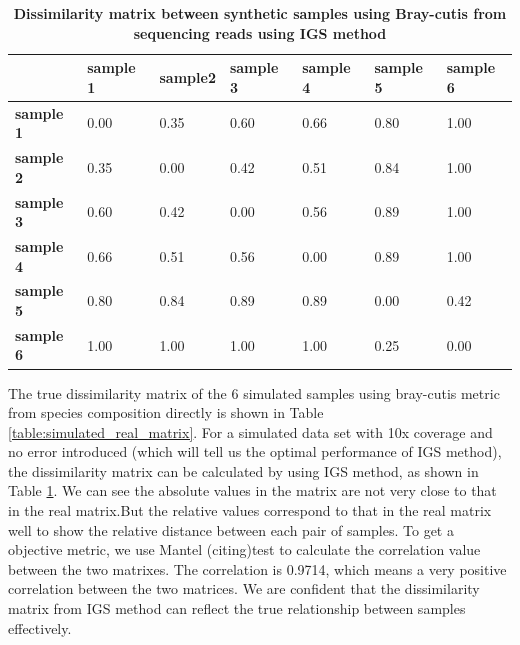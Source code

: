 \begin{table}[h]
\begin{tabular}{|l|l|l|l|l|l|l|}
\hline
                  & \textbf{sample 1} & \textbf{sample2} & \textbf{sample 3} & \textbf{sample 4} & \textbf{sample 5} & \textbf{sample 6} \\ \hline
\textbf{sample 1} & 0.00              & 0.35             & 0.60              & 0.66              & 0.80              & 1.00              \\ \hline
\textbf{sample 2} & 0.35              & 0.00             & 0.42              & 0.51              & 0.84              & 1.00              \\ \hline
\textbf{sample 3} & 0.60              & 0.42             & 0.00              & 0.56              & 0.89              & 1.00              \\ \hline
\textbf{sample 4} & 0.66              & 0.51             & 0.56              & 0.00              & 0.89              & 1.00              \\ \hline
\textbf{sample 5} & 0.80              & 0.84             & 0.89              & 0.89              & 0.00              & 0.42              \\ \hline
\textbf{sample 6} & 1.00              & 1.00             & 1.00              & 1.00              & 0.25              & 0.00              \\ \hline
\end{tabular}
\caption{\bf Dissimilarity matrix between synthetic samples using Bray-cutis from sequencing reads using IGS method }
\label{table:simulated_matrix1}
\end{table}


The true dissimilarity matrix of the 6 simulated samples using bray-cutis 
metric from species composition directly is shown in Table \ref{table:simulated_real_matrix}.
For a simulated data set with 10x coverage and no error introduced 
(which will tell us the optimal performance of IGS method), the dissimilarity 
matrix can be calculated by using IGS method, as shown in Table 
\ref{table:simulated_matrix1}. We can see the absolute values in the matrix 
are not very close to that in the real matrix.But the relative values 
correspond to that in the real matrix well to show the relative distance 
between each pair of samples. To get a objective metric, we use 
Mantel (citing)test to calculate the correlation value between the two 
matrixes. The correlation is 0.9714, which means a very positive correlation 
between the two matrices. We are confident that the dissimilarity matrix from IGS method 
can reflect the true relationship between samples effectively.


